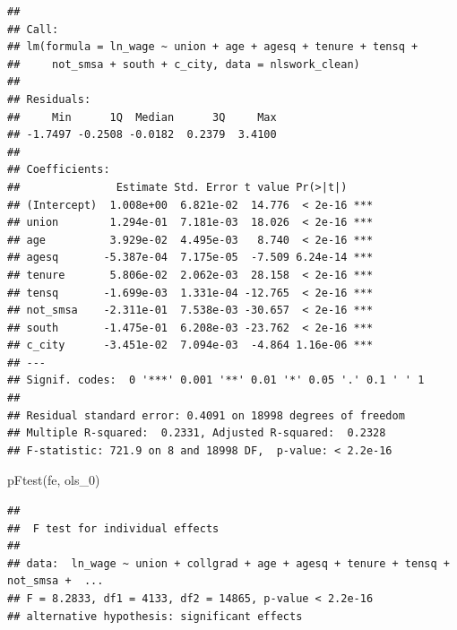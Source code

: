 \documentclass[
]{article}
\newenvironment{Shaded}{\begin{snugshade}}{\end{snugshade}}
\newcommand{\FunctionTok}[1]{\textcolor[rgb]{0.00,0.00,0.00}{#1}}
\newcommand{\NormalTok}[1]{#1}
\begin{document}
\begin{verbatim}
## 
## Call:
## lm(formula = ln_wage ~ union + age + agesq + tenure + tensq + 
##     not_smsa + south + c_city, data = nlswork_clean)
## 
## Residuals:
##     Min      1Q  Median      3Q     Max 
## -1.7497 -0.2508 -0.0182  0.2379  3.4100 
## 
## Coefficients:
##               Estimate Std. Error t value Pr(>|t|)    
## (Intercept)  1.008e+00  6.821e-02  14.776  < 2e-16 ***
## union        1.294e-01  7.181e-03  18.026  < 2e-16 ***
## age          3.929e-02  4.495e-03   8.740  < 2e-16 ***
## agesq       -5.387e-04  7.175e-05  -7.509 6.24e-14 ***
## tenure       5.806e-02  2.062e-03  28.158  < 2e-16 ***
## tensq       -1.699e-03  1.331e-04 -12.765  < 2e-16 ***
## not_smsa    -2.311e-01  7.538e-03 -30.657  < 2e-16 ***
## south       -1.475e-01  6.208e-03 -23.762  < 2e-16 ***
## c_city      -3.451e-02  7.094e-03  -4.864 1.16e-06 ***
## ---
## Signif. codes:  0 '***' 0.001 '**' 0.01 '*' 0.05 '.' 0.1 ' ' 1
## 
## Residual standard error: 0.4091 on 18998 degrees of freedom
## Multiple R-squared:  0.2331, Adjusted R-squared:  0.2328 
## F-statistic: 721.9 on 8 and 18998 DF,  p-value: < 2.2e-16
\end{verbatim}

\begin{Shaded}
\begin{Highlighting}[]
  \FunctionTok{pFtest}\NormalTok{(fe, ols\_0)}
\end{Highlighting}
\end{Shaded}

\begin{verbatim}
## 
##  F test for individual effects
## 
## data:  ln_wage ~ union + collgrad + age + agesq + tenure + tensq + not_smsa +  ...
## F = 8.2833, df1 = 4133, df2 = 14865, p-value < 2.2e-16
## alternative hypothesis: significant effects
\end{verbatim}
\end{document}
